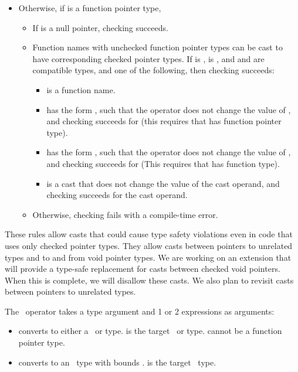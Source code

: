 \begin{itemize}
\item Otherwise, if  is a function pointer type,
\begin{itemize}
\item If  is a null pointer, checking succeeds.
\item Function names with unchecked function pointer types can be cast to have corresponding checked
pointer types.  If  is \ptrT,  is , and  and  are
compatible types, and one of the following, then checking succeeds:
\begin{itemize}
\item {} is a function name.
\item {} has the form \code{*}, such that the \code{*} operator does not change the value of ,
and checking succeeds for  (this requires that  has function pointer type).
\item {} has the form \code{&}, such that the \code{&} operator does not change the value of ,
and checking succeeds for  (This requires that  has function type).
\item {} is a cast that does not change the value of the cast operand, and checking succeeds for the cast
operand.
\end{itemize}
\item Otherwise, checking fails with a compile-time error.
\end{itemize}
\end{itemize}

These rules allow casts that could cause type safety violations even in code
that uses only checked pointer types.  They allow casts between pointers to unrelated types
and to and from void pointer types.  We are working on an extension that will provide
a type-safe replacement for casts between checked void pointers.  When this is complete, we
will disallow these casts. We also plan to revisit casts between pointers to
unrelated types.

The \dynamicboundscast\ operator takes a type argument  and 1 or 2 expressions
as arguments:
\begin{itemize}
\item
  converts  to either a \ptr\ or \code{*} type.   is the target \ptr\
  or \code{*} type.   cannot be a function pointer type.
\item
   converts \var{e1} to an \arrayptr\ type with
  bounds \var{bounds-exp}.  \var{D} is the target \arrayptr\ type.
\end{itemize}

